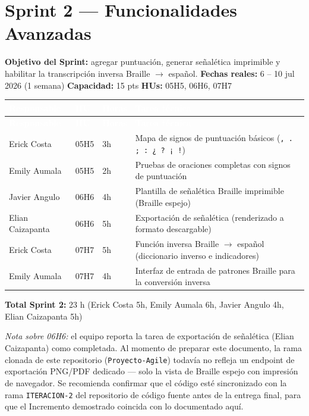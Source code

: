 \documentclass[11pt]{article}
\begin{document}
\section{Sprint 2 --- Funcionalidades Avanzadas}
\textbf{Objetivo del Sprint:} agregar puntuación, generar señalética imprimible y habilitar la
transcripción inversa Braille $\rightarrow$ español.
\quad\textbf{Fechas reales:} 6 -- 10 jul 2026 (1 semana)
\quad\textbf{Capacidad:} 15 pts \quad \textbf{HUs:} 05H5, 06H6, 07H7

\begin{longtable}{|p{3cm}|p{1cm}|p{1.1cm}|p{7.6cm}|}
\hline
\rowcolor{epnblue}
\textcolor{white}{\textbf{Responsable}} & \textcolor{white}{\textbf{HU}} & \textcolor{white}{\textbf{Horas}} & \textcolor{white}{\textbf{Tarea técnica}} \\
\hline
\endfirsthead
\hline
\rowcolor{epnblue}
\textcolor{white}{\textbf{Responsable}} & \textcolor{white}{\textbf{HU}} & \textcolor{white}{\textbf{Horas}} & \textcolor{white}{\textbf{Tarea técnica}} \\
\hline
\endhead
\rowcolor{epnrow}
Erick Costa & 05H5 & 3h & Mapa de signos de puntuación básicos (\texttt{, . ; : ¿ ? ¡ !}) \\
\hline
Emily Aumala & 05H5 & 2h & Pruebas de oraciones completas con signos de puntuación \\
\hline
\rowcolor{epnrow}
Javier Angulo & 06H6 & 4h & Plantilla de señalética Braille imprimible (Braille espejo) \\
\hline
Elian Caizapanta & 06H6 & 5h & Exportación de señalética (renderizado a formato descargable) \\
\hline
\rowcolor{epnrow}
Erick Costa & 07H7 & 5h & Función inversa Braille $\rightarrow$ español (diccionario inverso e indicadores) \\
\hline
Emily Aumala & 07H7 & 4h & Interfaz de entrada de patrones Braille para la conversión inversa \\
\hline
\end{longtable}
\textbf{Total Sprint 2:} 23 h (Erick Costa 5h, Emily Aumala 6h, Javier Angulo 4h, Elian Caizapanta 5h)

\vspace{0.2cm}
\noindent\textit{Nota sobre 06H6:} el equipo reporta la tarea de exportación de señalética (Elian
Caizapanta) como completada. Al momento de preparar este documento, la rama clonada de este repositorio
(\texttt{Proyecto-Agile}) todavía no refleja un endpoint de exportación PNG/PDF dedicado --- solo la vista
de Braille espejo con impresión de navegador. Se recomienda confirmar que el código esté sincronizado
con la rama \texttt{ITERACION-2} del repositorio de código fuente antes de la entrega final, para que el
Incremento demostrado coincida con lo documentado aquí.
\end{document}
